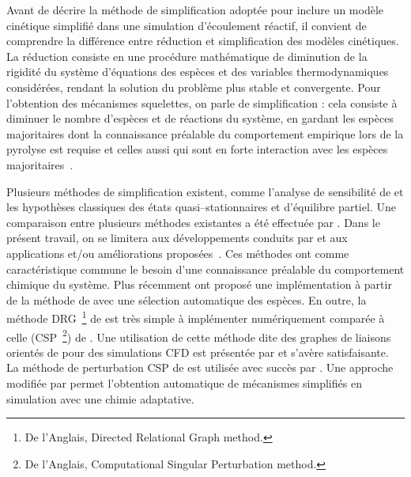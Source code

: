 Avant de décrire la méthode de simplification adoptée pour inclure un modèle cinétique simplifié dans une simulation d'écoulement réactif, il convient de comprendre la différence entre réduction et simplification des modèles cinétiques. La réduction consiste en une procédure mathématique de diminution de la rigidité du système d'équations des espèces et des variables thermodynamiques considérées, rendant la solution du problème plus stable et convergente. Pour l'obtention des mécanismes squelettes, on parle de simplification : cela consiste à diminuer le nombre d'espèces et de réactions du système, en gardant les espèces majoritaires \textendash{} dont la connaissance préalable du comportement empirique lors de la pyrolyse est requise \textendash{} et celles aussi qui sont en forte interaction avec les espèces majoritaires~\cite{Coles2011}.

Plusieurs méthodes de simplification existent, comme l'analyse de sensibilité de \citet{Turanyi1989} et les hypothèses classiques des états quasi--stationnaires et d'équilibre partiel. Une comparaison entre plusieurs méthodes existantes a été effectuée par \citet{Coles2011}.  Dans le présent travail, on se limitera aux développements conduits par \citet{Lu2005} et aux applications et/ou améliorations proposées~\cite{Lu2006i,Lu2006ii,Pepiot2008}.  Ces méthodes ont comme caractéristique commune le besoin d'une connaissance préalable du comportement chimique du système. Plus récemment \citet{Curtis2015} ont proposé une implémentation à partir de la méthode de \citet{Pepiot2008} avec une sélection automatique des espèces. En outre, la méthode DRG~\footnote{De l'Anglais, Directed Relational Graph method.} de \citet{Lu2005} est très simple  à implémenter numériquement comparée à celle (CSP~\footnote{De l'Anglais, Computational Singular Perturbation method.}) de \citet{Lam1993,Lam1994}. Une utilisation de cette méthode dite des graphes de liaisons orientés de \citet{Lu2005} pour des simulations CFD est présentée par \citet{Liang2009} et s'avère satisfaisante.  La méthode de perturbation CSP de \citet{Lam1994} est utilisée avec succès par \citet{Ortega2007}. Une approche modifiée par \citet{Curtis2015} permet l'obtention automatique de mécanismes simplifiés en simulation avec une chimie adaptative.

\clearpage

